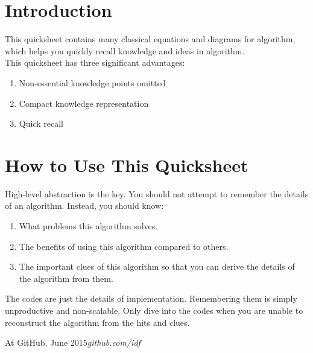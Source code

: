 %
%

\preface
\section*{Introduction}
This quicksheet contains many classical equations and diagrams for algorithm, which helps you quickly recall knowledge and ideas in algorithm.\\

This quicksheet has three significant advantages:
\begin{enumerate}
\item Non-essential knowledge points omitted
\item Compact knowledge representation
\item Quick recall
\end{enumerate}
\section*{How to Use This Quicksheet}
High-level abstraction is the key. You should not attempt to remember the details of an algorithm. Instead, you should know:
\begin{enumerate}
\item What problems this algorithm solves.
\item The benefits of using this algorithm compared to others.
\item The important clues of this algorithm so that you can derive the details of the algorithm from them.
\end{enumerate}
The codes are just the details of implementation. Remembering them is simply unproductive and non-scalable. Only dive into the codes when you are unable to reconstruct the algorithm from the hits and clues. 

\vspace{\baselineskip}
\begin{flushright}\noindent
At GitHub, June 2015\hfill {\it github.com/idf} \\
\end{flushright}
